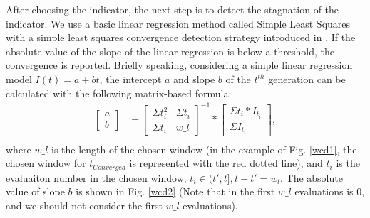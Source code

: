 \documentclass[conference]{IEEEtran}
\begin{document}
After choosing the indicator, the next step is to detect the stagnation of the indicator.
We use a basic linear regression method called Simple Least Squares\cite{SimpleLeastSquares} with a
simple least squares convergence detection strategy introduced in \cite{convergenceDetection:LSSC}.
If the absolute value of the slope of the linear regression is below a threshold, the convergence is reported.
Briefly speaking, considering a simple linear regression model $I(t)=a+bt$, 
the intercept $a$ and slope $b$ of the $t^{th}$ generation can be calculated 
with the following matrix-based formula:
\begin{equation}\begin{aligned}\label{elr1}
  \left[
    \begin{matrix}
      a \\
      b
    \end{matrix}
  \right]
  &= 
  \left[
    \begin{matrix}
      \Sigma t_i^2 & \Sigma t_i \\
      \Sigma t_i   & w\_l 
    \end{matrix}
  \right]^{-1}
  *
  \left[
    \begin{matrix}
      \Sigma t_i * I_{t_i} \\
      \Sigma I_{t_i} 
    \end{matrix}
  \right], \\
\end{aligned}
\end{equation}
where $w\_ l$ is the length of the chosen window
(in the example of Fig. \ref{wcd1}, the chosen window for $t_{Converged}$ is represented with the red dotted line), 
and $t_i$ is the evaluaiton number in the chosen window, $t_i \in (t',t], t - t' = w_l$.
The absolute value of slope $b$ is shown in Fig. \ref{wcd2} 
(Note that in the first $w\_ l$ evaluations is 0, 
and we should not consider the first $w\_ l$ evaluations). 
\end{document}
